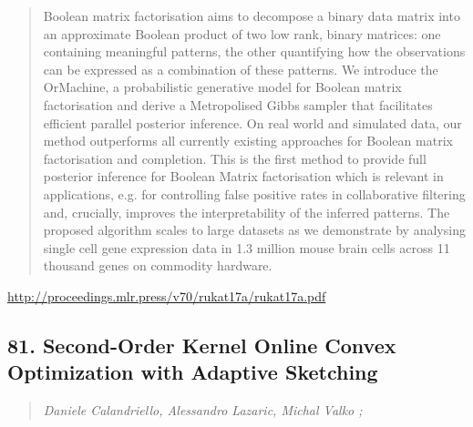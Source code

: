 \documentclass{article}
\begin{document}
\begin{quote}
    Boolean matrix factorisation aims to decompose a binary data matrix into an approximate Boolean product of two low rank, binary matrices: one containing meaningful patterns, the other quantifying how the observations can be expressed as a combination of these patterns. We introduce the OrMachine, a probabilistic generative model for Boolean matrix factorisation and derive a Metropolised Gibbs sampler that facilitates efficient parallel posterior inference. On real world and simulated data, our method outperforms all currently existing approaches for Boolean matrix factorisation and completion. This is the first method to provide full posterior inference for Boolean Matrix factorisation which is relevant in applications, e.g. for controlling false positive rates in collaborative filtering and, crucially, improves the interpretability of the inferred patterns. The proposed algorithm scales to large datasets as we demonstrate by analysing single cell gene expression data in 1.3 million mouse brain cells across 11 thousand genes on commodity hardware.  
\end{quote}

\href{http://proceedings.mlr.press/v70/rukat17a/rukat17a.pdf}{http://proceedings.mlr.press/v70/rukat17a/rukat17a.pdf}

\subsection{81. Second-Order Kernel Online Convex Optimization with Adaptive Sketching}

\begin{quote}
\footnotesize{\textit{Daniele Calandriello, Alessandro Lazaric, Michal Valko ;}}

\end{quote}
\end{document}
